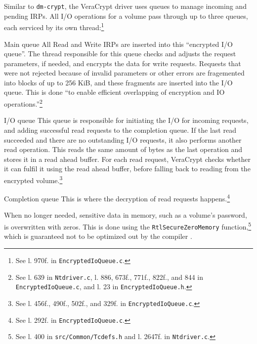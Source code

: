 Similar to \texttt{dm-crypt}, the VeraCrypt driver uses queues to manage incoming and pending IRPs. All I/O operations for a volume pass through up to three queues, each serviced by its own thread:\footnote{\label{fn:otherapproaches.veracrypt.queuecreation} See l. 970f. in \texttt{EncryptedIoQueue.c}.}
\begin{descitemize}
	\item[Main queue] All Read and Write IRPs are inserted into this ``encrypted I/O queue''. The thread responsible for this queue checks and adjusts the request parameters, if needed, and encrypts the data for write requests. Requests that were not rejected because of invalid parameters or other errors are fragemented into blocks of up to 256 KiB, and these fragments are inserted into the I/O queue. This is done ``to enable efficient overlapping of encryption and IO operations.''\footnote{\label{fn:otherapproaches.veracrypt.mainqueue} See l. 639 in \texttt{Ntdriver.c}, l. 886, 673f., 771f., 822f., and 844 in \texttt{EncryptedIoQueue.c}, and l. 23 in \texttt{EncryptedIoQueue.h}.}
	\item[I/O queue] This queue is responsible for initiating the I/O for incoming requests, and adding successful read requests to the completion queue. If the last read succeeded and there are no outstanding I/O requests, it also performs another read operation. This reads the same amount of bytes as the last operation and stores it in a read ahead buffer. For each read request, VeraCrypt checks whether it can fulfil it using the read ahead buffer, before falling back to reading from the encrypted volume.\footnote{\label{fn:otherapproaches.veracrypt.ioqueue} See l. 456f., 490f., 502f., and 329f. in \texttt{EncryptedIoQueue.c}.}
	\item[Completion queue] This is where the decryption of read requests happens.\footnote{\label{fn:otherapproaches.veracrypt.completionqueue} See l. 292f. in \texttt{EncryptedIoQueue.c}.}
\end{descitemize}

When no longer needed, sensitive data in memory, such as a volume's password, is overwritten with zeros. This is done using the \texttt{RtlSecureZeroMemory} function,\footnote{\label{fn:otherapproaches.veracrypt.zeromem} See l. 400 in \texttt{src/Common/Tcdefs.h} and l. 2647f. in \texttt{Ntdriver.c}.} which is guaranteed not to be optimized out by the compiler \cite{Wdk}.

